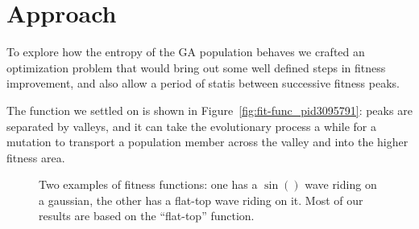 \documentclass[11pt]{article}
\begin{document}
\section{Approach}
\label{sec:org8c588e5}

To explore how the entropy of the GA population behaves we crafted an
optimization problem that would bring out some well defined steps in
fitness improvement, and also allow a period of statis between
successive fitness peaks.

The function we settled on is shown in
Figure~\ref{fig:fit-func_pid3095791}: peaks are separated by valleys,
and it can take the evolutionary process a while for a mutation to
transport a population member across the valley and into the higher
fitness area.

\begin{figure}
  \label{fig:fit-func_pid3095791}
  \centering
  \caption{Two examples of fitness functions: one has a $\sin()$ wave
    riding on a gaussian, the other has a flat-top wave riding on it.
  Most of our results are based on the ``flat-top'' function.}
  \label{fig:multi-step}
\end{figure}
\end{document}
